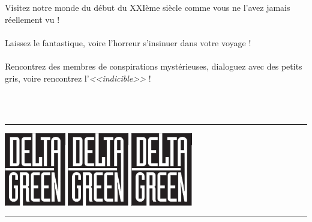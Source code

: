 \documentclass[40pt,twoside,a4paper]{article}
\begin{document}
\begin{minipage}[ht]{0.65\textwidth}
	{\Large
		Visitez notre monde du d{\'e}but du XXI{\`e}me si{\`e}cle comme vous ne l'avez jamais r{\'e}ellement vu !~\\~\\
		Laissez le fantastique, voire l'horreur s'insinuer dans votre voyage !~\\~\\
		Rencontrez des membres de conspirations myst{\'e}rieuses, dialoguez avec des petits gris, voire rencontrez l'\emph{<<indicible>>} !~\\~\\
	}

\end{minipage} ~\\

\hrule

\begin{center} 
	\includegraphics[width=0.20\textwidth]{img/DeltaGreenLogo.png} \hfill
	\includegraphics[width=0.20\textwidth]{img/DeltaGreenLogo.png} \hfill
	\includegraphics[width=0.20\textwidth]{img/DeltaGreenLogo.png} %
\end{center}

\hrule

~\\
\end{document}
